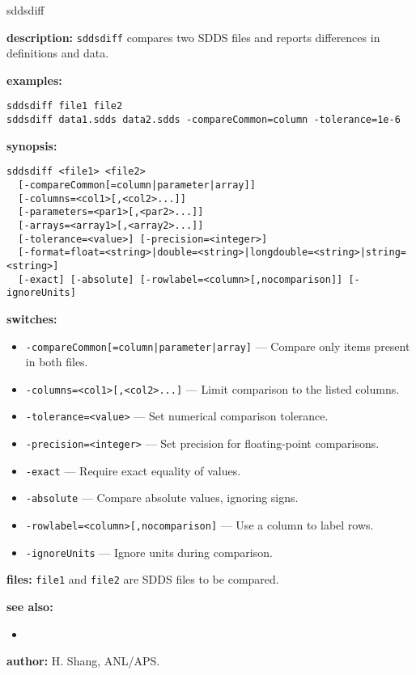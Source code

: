 \begin{sddsprog}{sddsdiff}
  \item \textbf{description:}
    \verb|sddsdiff| compares two SDDS files and reports differences in definitions and data.
  \item \textbf{examples:}
    \begin{verbatim}
sddsdiff file1 file2
sddsdiff data1.sdds data2.sdds -compareCommon=column -tolerance=1e-6
    \end{verbatim}
  \item \textbf{synopsis:}
    \begin{verbatim}
sddsdiff <file1> <file2>
  [-compareCommon[=column|parameter|array]]
  [-columns=<col1>[,<col2>...]]
  [-parameters=<par1>[,<par2>...]]
  [-arrays=<array1>[,<array2>...]]
  [-tolerance=<value>] [-precision=<integer>]
  [-format=float=<string>|double=<string>|longdouble=<string>|string=<string>]
  [-exact] [-absolute] [-rowlabel=<column>[,nocomparison]] [-ignoreUnits]
    \end{verbatim}
  \item \textbf{switches:}
    \begin{itemize}
      \item \verb!-compareCommon[=column|parameter|array]! --- Compare only items present in both files.
      \item \verb|-columns=<col1>[,<col2>...]| --- Limit comparison to the listed columns.
      \item \verb|-tolerance=<value>| --- Set numerical comparison tolerance.
      \item \verb|-precision=<integer>| --- Set precision for floating-point comparisons.
      \item \verb|-exact| --- Require exact equality of values.
      \item \verb|-absolute| --- Compare absolute values, ignoring signs.
      \item \verb|-rowlabel=<column>[,nocomparison]| --- Use a column to label rows.
      \item \verb|-ignoreUnits| --- Ignore units during comparison.
    \end{itemize}
  \item \textbf{files:}
    \verb|file1| and \verb|file2| are SDDS files to be compared.
  \item \textbf{see also:}
    \begin{itemize}
      \item {}
    \end{itemize}
  \item \textbf{author:} H. Shang, ANL/APS.
\end{sddsprog}
